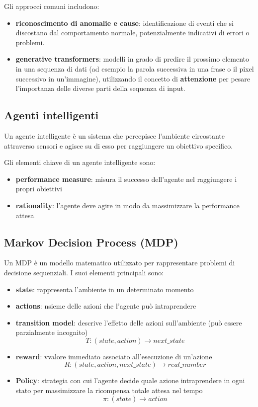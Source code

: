 \documentclass[12pt, a4paper, oneside]{book}
\begin{document}
    Gli approcci comuni includono:
    \begin{itemize}
      \item \textbf{riconoscimento di anomalie e cause}: identificazione di eventi che si discostano dal comportamento normale, potenzialmente indicativi di errori o problemi.

      \item \textbf{generative transformers}: modelli in grado di predire il prossimo elemento in una sequenza di dati (ad esempio la parola successiva in una frase o il pixel successivo in un’immagine), utilizzando il concetto di \textbf{attenzione} per pesare l’importanza delle diverse parti della sequenza di input.
    \end{itemize}

    \subsection{Agenti intelligenti}
    Un agente intelligente è un sistema che percepisce l’ambiente circostante attraverso sensori e agisce su di esso per raggiungere un obiettivo specifico.

    Gli elementi chiave di un agente intelligente sono:
    \begin{itemize}
      \item \textbf{performance measure}: misura il successo dell’agente nel raggiungere i propri obiettivi
      \item \textbf{rationality}: l’agente deve agire in modo da massimizzare la performance attesa
    \end{itemize}

    \subsection{Markov Decision Process (MDP)}
    Un MDP è un modello matematico utilizzato per rappresentare problemi di decisione sequenziali. I suoi elementi principali sono:
    \begin{itemize}
      \item \textbf{state}: rappresenta l’ambiente in un determinato momento
      \item \textbf{actions}: nsieme delle azioni che l’agente può intraprendere
      \item \textbf{transition model}: descrive l’effetto delle azioni sull’ambiente (può essere parzialmente incognito)
        \[
          T: (state, action) \to next\_state
        \] 
      \item \textbf{reward}: vvalore immediato associato all’esecuzione di un’azione
        \[
          R: (state, action, next\_state) \to real\_number
        \] 
      \item \textbf{Policy}: strategia con cui l’agente decide quale azione intraprendere in ogni stato per massimizzare la ricompensa totale attesa nel tempo
        \[
          \pi: (state) \to action
        \] 
    \end{itemize}
\end{document}
